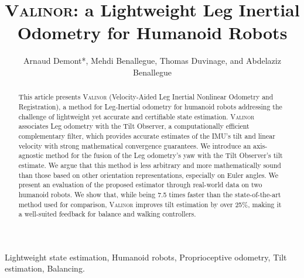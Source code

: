 \documentclass{IJCAS}
\begin{document}
\newcommand{\getErrorResult}[5]{\csname#1#2#3#4#5\endcsname}



\title{{\scshape Valinor}: a Lightweight Leg Inertial Odometry for Humanoid Robots}

\author{Arnaud Demont*, Mehdi Benallegue, Thomas Duvinage, and Abdelaziz Benallegue}

\begin{abstract}
This article presents {\scshape Valinor} (Velocity-Aided Leg Inertial Nonlinear Odometry and Registration), a method for Leg-Inertial odometry for humanoid robots addressing the challenge of lightweight yet accurate and certifiable state estimation. {\scshape Valinor} associates Leg odometry with the Tilt Observer, a computationally efficient complementary filter, which provides accurate estimates of the IMU's tilt and linear velocity with strong mathematical convergence guarantees. We introduce an axis-agnostic method for the fusion of the Leg odometry's yaw with the Tilt Observer's tilt estimate. We argue that this method is less arbitrary and more mathematically sound than those based on other orientation representations, especially on Euler angles.
We present an evaluation of the proposed estimator through real-world data on two humanoid robots. We show that, while being 7.5 times faster than the state-of-the-art method used for comparison, {\scshape Valinor} improves tilt estimation by over 25\%, making it a well-suited feedback for balance and walking controllers. 
\end{abstract}

\begin{keywords}
  Lightweight state estimation, Humanoid robots, Proprioceptive odometry, Tilt estimation, Balancing.
\end{keywords}

\maketitle

\end{document}
